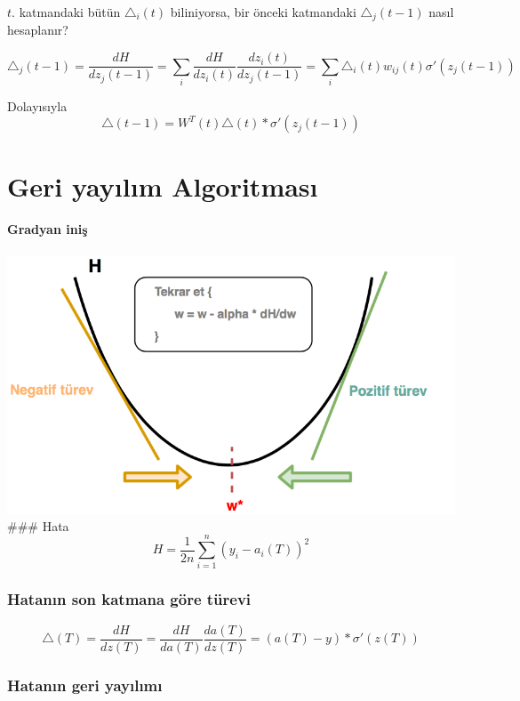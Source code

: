 \documentclass[11pt]{article}
\makeatletter
\def\maxwidth{\ifdim\Gin@nat@width>\linewidth\linewidth
    \else\Gin@nat@width\fi}
\let\Oldincludegraphics\includegraphics
\renewcommand{\includegraphics}[1]{\Oldincludegraphics[width=.8\maxwidth]{#1}}
\makeatother
\begin{document}
\(t.\) katmandaki bütün \(\triangle_i(t)\) biliniyorsa, bir önceki
katmandaki \(\triangle_j(t-1)\) nasıl hesaplanır?

\[
\triangle_j(t-1) =
\frac{dH}{ dz_{j}(t-1)} 
= \sum_i \frac{dH}{ dz_{i}(t)} \frac{dz_i(t)}{dz_j(t-1)}
= \sum_i \triangle_i(t) w_{ij}(t) \sigma'(z_j(t-1)) 
\]

Dolayısıyla \[
\triangle(t-1) 
= W^T(t) \triangle(t)  * \sigma'(z_j(t-1)) 
\]

    \section{Geri yayılım
Algoritması}\label{geri-yayux131lux131m-algoritmasux131}

\paragraph{Gradyan iniş}\label{gradyan-iniux15f}

\includegraphics{gradyan.png} \#\#\# Hata \[
H = \frac{1}{2n} \sum^n_{i=1} (y_i - a_i(T))^2
\]

\subsubsection{Hatanın son katmana göre
türevi}\label{hatanux131n-son-katmana-guxf6re-tuxfcrevi}

\[
\triangle(T) =  \frac{dH}{ dz(T)} = \frac{dH}{ da(T)} \frac{da(T)}{ dz(T)}
= (a(T) - y) * \sigma'(z(T))
\]

\subsubsection{Hatanın geri
yayılımı}\label{hatanux131n-geri-yayux131lux131mux131}
\end{document}
